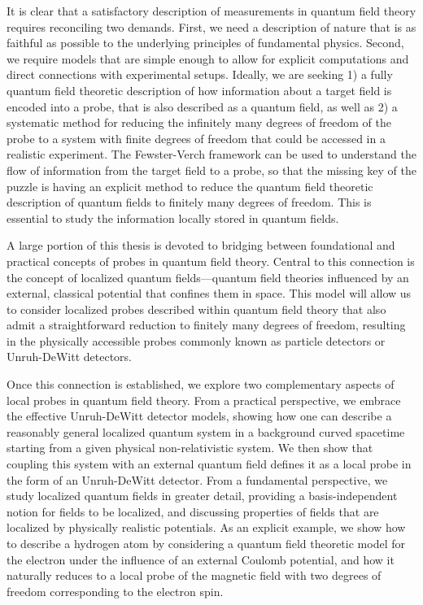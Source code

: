 \documentclass[letterpaper,12pt,titlepage,oneside,final]{book}
\begin{document}
It is clear that a satisfactory description of measurements in quantum field theory requires reconciling two demands. First, we need a description of nature that is as faithful as possible to the underlying principles of fundamental physics. Second, we require models that are simple enough to allow for explicit computations and direct connections with experimental setups. Ideally, we are seeking 1) a fully quantum field theoretic description of how information about a target field is encoded into a probe, that is also described as a quantum field, as well as 2) a systematic method for reducing the infinitely many degrees of freedom of the probe to a system with finite degrees of freedom that could be accessed in a realistic experiment. The Fewster-Verch framework can be used to understand the flow of information from the target field to a probe, so that the missing key of the puzzle is having an explicit method to reduce the quantum field theoretic description of quantum fields to finitely many degrees of freedom. This is essential to study the information locally stored in quantum fields.


A large portion of this thesis is devoted to bridging between foundational and practical concepts of probes in quantum field theory. Central to this connection is the concept of localized quantum fields---quantum field theories influenced by an external, classical potential that confines them in space. This model will allow us to consider localized probes described within quantum field theory that also admit a straightforward reduction to finitely many degrees of freedom, resulting in the physically accessible probes commonly known as particle detectors or Unruh-DeWitt detectors.

Once this connection is established, we explore two complementary aspects of local probes in quantum field theory. From a practical perspective, we embrace the effective Unruh-DeWitt detector models, showing how one can describe a reasonably general localized quantum system in a background curved spacetime starting from a given physical non-relativistic system. We then show that coupling this system with an external quantum field defines it as a local probe in the form of an Unruh-DeWitt detector. From a fundamental perspective, we study localized quantum fields in greater detail, providing a basis-independent notion for fields to be localized, and discussing properties of fields that are localized by physically realistic potentials. As an explicit example, we show how to describe a hydrogen atom by considering a quantum field theoretic model for the electron under the influence of an external Coulomb potential, and how it naturally reduces to a local probe of the magnetic field with two degrees of freedom corresponding to the electron spin.
\end{document}
